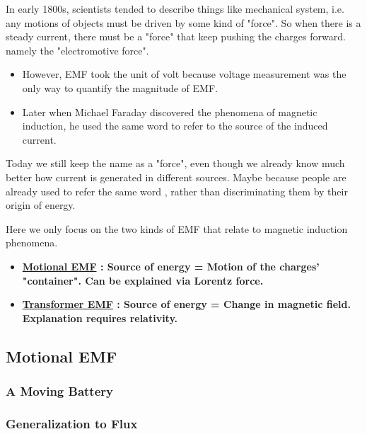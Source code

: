 \documentclass[class=article, crop=false, 12pt]{standalone}
\begin{document}

In early 1800s, scientists tended to describe things like mechanical system,
i.e. any motions of objects must be driven by some kind of "force".
So when there is a steady current, 
there must be a "force" that keep pushing the charges forward.
namely the "electromotive force". 

\begin{itemize}
    \item However, EMF took the unit of volt because 
    voltage measurement was the only way to quantify the magnitude of EMF.
    \item Later when Michael Faraday discovered the phenomena of magnetic induction,
    he used the same word to refer to the source of the induced current.
\end{itemize}


Today we still keep the name as a "force", 
even though we already know much better how current is generated in different sources.
Maybe because people are already used to refer the same word , 
rather than discriminating them by their origin of energy.


Here we only focus on the two kinds of EMF that relate to magnetic induction phenomena.
\begin{itemize}
    \item \bf{\ul{Motional EMF}} : Source of energy = Motion of the charges' "container".
    Can be explained via Lorentz force.

    \item \bf{\ul{Transformer EMF}} : Source of energy = Change in magnetic field.
    Explanation requires relativity.
\end{itemize}


\subsection{Motional EMF}


\subsubsection{A Moving Battery}

\subsubsection{Generalization to Flux}
\end{document}
